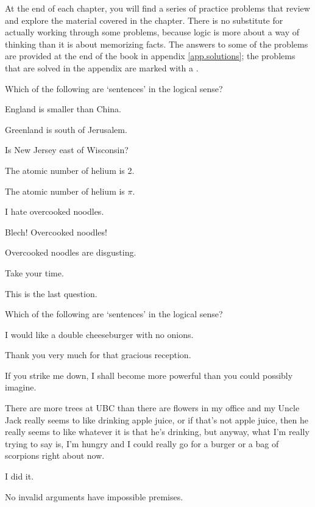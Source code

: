 \practiceproblems
At the end of each chapter, you will find a series of practice problems that review and explore the material covered in the chapter. There is no substitute for actually working through some problems, because logic is more about a way of thinking than it is about memorizing facts. The answers to some of the problems are provided at the end of the book in appendix \ref{app.solutions}; the problems that are solved in the appendix are marked with a \solutions.

\solutions
\problempart
\label{pr.Sentences1}
Which of the following are `sentences' in the logical sense?
\begin{earg}
\item England is smaller than China.
\item Greenland is south of Jerusalem.
\item Is New Jersey east of Wisconsin?
\item The atomic number of helium is 2.
\item The atomic number of helium is $\pi$.
\item I hate overcooked noodles.
\item Blech! Overcooked noodles!
\item Overcooked noodles are disgusting.
\item Take your time.
\item This is the last question.
\end{earg}

\problempart
\label{hw1.B}
Which of the following are `sentences' in the logical sense?
	\begin{earg}
		\item I would like a double cheeseburger with no onions.
		\item Thank you very much for that gracious reception.
		\item If you strike me down, I shall become more powerful than you could possibly imagine.
		\item There are more trees at UBC than there are flowers in my office and my Uncle Jack really seems to like drinking apple juice, or if that's not apple juice, then he really seems to like whatever it is that he's drinking, but anyway, what I'm really trying to say is, I'm hungry and I could really go for a burger or a bag of scorpions right about now.
		\item I did it.
		\item No invalid arguments have impossible premises.
	\end{earg}

